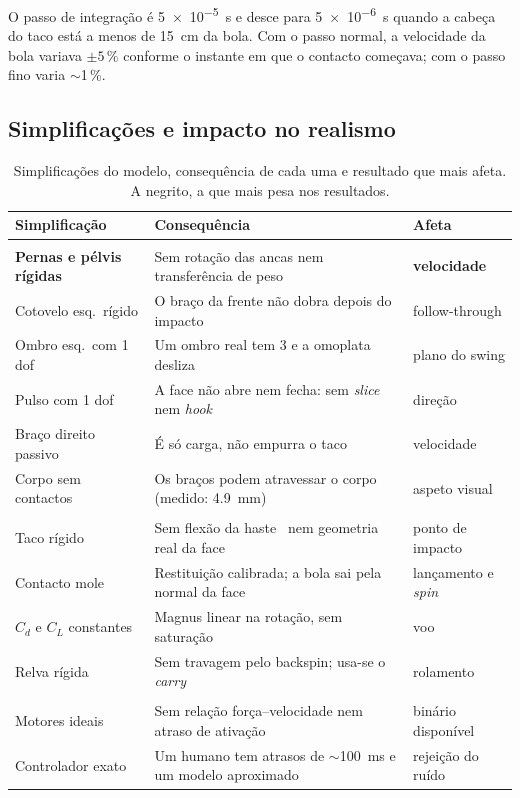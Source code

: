\documentclass[11pt,a4paper]{article}
\begin{document}
O passo de integração é \SI{5e-5}{\second} e desce para \SI{5e-6}{\second}
quando a cabeça do taco está a menos de \SI{15}{\centi\meter} da bola. Com o
passo normal, a velocidade da bola variava $\pm5\,\%$ conforme o instante em
que o contacto começava; com o passo fino varia $\sim$1\,\%.

\subsection{Simplificações e impacto no realismo}

\begin{table}[H]
\centering
\caption{Simplificações do modelo, consequência de cada uma e resultado que
mais afeta. A negrito, a que mais pesa nos resultados.}
\label{tab:simpl}
\small
\renewcommand{\arraystretch}{1.25}
\begin{tabularx}{\textwidth}{@{}>{\raggedright\arraybackslash}p{3.5cm}L>{\raggedright\arraybackslash}p{2.7cm}@{}}
\toprule
{}
Simplificação & Consequência & Afeta \\
\midrule
{} \\
\textbf{Pernas e pélvis rígidas} & Sem rotação das ancas nem transferência de peso~\cite{hume2005} & \textbf{velocidade} \\
Cotovelo esq.\ rígido  & O braço da frente não dobra depois do impacto        & follow-through \\
Ombro esq.\ com 1 dof  & Um ombro real tem 3 e a omoplata desliza             & plano do swing \\
Pulso com 1 dof        & A face não abre nem fecha: sem \emph{slice} nem \emph{hook} & direção \\
Braço direito passivo  & É só carga, não empurra o taco                       & velocidade \\
Corpo sem contactos    & Os braços podem atravessar o corpo (medido: \SI{4.9}{\milli\meter}) & aspeto visual \\
\addlinespace
{} \\
Taco rígido            & Sem flexão da haste~\cite{milne1992} nem geometria real da face & ponto de impacto \\
Contacto mole          & Restituição calibrada; a bola sai pela normal da face & lançamento e \emph{spin} \\
$C_d$ e $C_L$ constantes & Magnus linear na rotação, sem saturação             & voo \\
Relva rígida           & Sem travagem pelo backspin; usa-se o \emph{carry}~\cite{penner2002} & rolamento \\
\addlinespace
{} \\
Motores ideais         & Sem relação força--velocidade nem atraso de ativação & binário disponível \\
Controlador exato      & Um humano tem atrasos de $\sim$\SI{100}{\milli\second} e um modelo aproximado & rejeição do ruído \\
\bottomrule
\end{tabularx}
\end{table}
\end{document}
